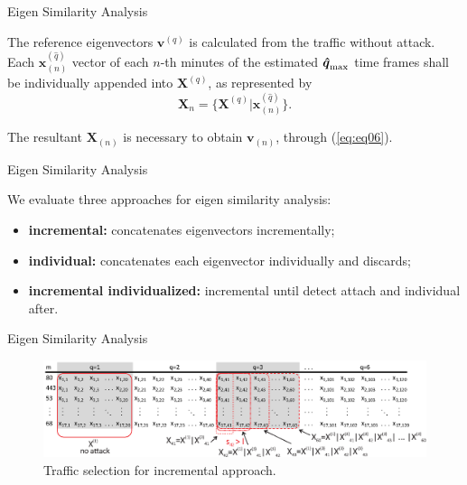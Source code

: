 \documentclass[newPxFont, numfooter, sectionpages]{beamer}
\begin{document}
\begin{frame}{Eigen Similarity Analysis}
	
	The reference eigenvectors $\boldsymbol{v}^{(q)}$ is calculated from the traffic without attack. Each $\boldsymbol{x}^{(\hat{q})}_{(n)}$ vector of each $n$-th minutes of the estimated $\rm{\boldsymbol{\hat{q}}}_{\rm max}$ time frames shall be individually appended into $\boldsymbol{X}^{(q)}$, as represented by
	\begin{equation}\label{eq:eq12}
		\boldsymbol{X}_{n} = \{\boldsymbol{X}^{(q)} | \boldsymbol{x}^{(\hat{q})}_{(n)}\}.
	\end{equation}

	The resultant $\boldsymbol{X}_{(n)}$ is necessary to obtain $\boldsymbol{v}_{(n)}$, through (\ref{eq:eq06}).

\end{frame}
\begin{frame}{Eigen Similarity Analysis}
	
	We evaluate three approaches for eigen similarity analysis: 
	\begin{itemize}
		\item \textbf{incremental:} concatenates eigenvectors incrementally;
		\item \textbf{individual:} concatenates each eigenvector individually and discards;
		\item \textbf{incremental individualized:} incremental until detect attach and individual after.
	\end{itemize}

\end{frame}
\begin{frame}{Eigen Similarity Analysis}
	
	\begin{figure}[h!]
		\centering
	    \includegraphics[width=11.5cm]{../figures/incremental.eps}
	    \caption{Traffic selection for incremental approach.}
	    \label{fig:2_fig8}
	\end{figure}

\end{frame}
\end{document}
